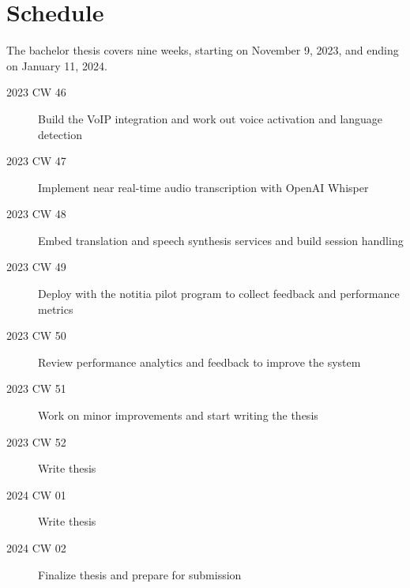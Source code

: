 \documentclass[a4paper,10pt]{report}
\begin{document}
\section{Schedule}
The bachelor thesis covers nine weeks, starting on November 9, 2023, and ending on January 11, 2024.
\begin{description}
  \item[2023 CW 46] Build the VoIP integration and work out voice activation and language detection
  \item[2023 CW 47] Implement near real-time audio transcription with OpenAI Whisper
  \item[2023 CW 48] Embed translation and speech synthesis services and build session handling
  \item[2023 CW 49] Deploy with the notitia pilot program to collect feedback and performance metrics
  \item[2023 CW 50] Review performance analytics and feedback to improve the system
  \item[2023 CW 51] Work on minor improvements and start writing the thesis
  \item[2023 CW 52] Write thesis
  \item[2024 CW 01] Write thesis
  \item[2024 CW 02] Finalize thesis and prepare for submission
\end{description}
\end{document}
